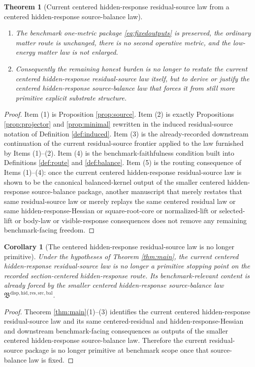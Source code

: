 \documentclass[11pt]{article}
\newcommand{\SourceBalanceLawPackage}{\mathfrak B^{\mathrm{disp,hid,res,src,bal}}}
\newtheorem{corollary}{Corollary}
\newtheorem{theorem}{Theorem}
\begin{document}
\begin{theorem}[Current centered hidden-response residual-source law from a centered hidden-response source-balance law]
\begin{enumerate}
    \item The benchmark one-metric package \eqref{eq:fixedoutputs} is preserved, the ordinary matter route is unchanged, there is no second operative metric, and the low-energy matter law is not enlarged.
    \item Consequently the remaining honest burden is no longer to restate the current centered hidden-response residual-source law itself, but to derive or justify the centered hidden-response source-balance law that forces it from still more primitive explicit substrate structure.
\end{enumerate}
\end{theorem}

\begin{proof}
Item (1) is Proposition \ref{prop:source}. Item (2) is exactly Propositions \ref{prop:projector} and \ref{prop:minimal} rewritten in the induced residual-source notation of Definition \ref{def:induced}. Item (3) is the already-recorded downstream continuation of the current residual-source frontier applied to the law furnished by Items (1)--(2). Item (4) is the benchmark-faithfulness condition built into Definitions \ref{def:route} and \ref{def:balance}. Item (5) is the routing consequence of Items (1)--(4): once the current centered hidden-response residual-source law is shown to be the canonical balanced-kernel output of the smaller centered hidden-response source-balance package, another manuscript that merely restates that same residual-source law or merely replays the same centered residual law or same hidden-response-Hessian or square-root-core or normalized-lift or selected-lift or body-law or visible-response consequences does not remove any remaining benchmark-facing freedom.
\end{proof}

\begin{corollary}[The centered hidden-response residual-source law is no longer primitive]
\label{cor:nonprimitive}
Under the hypotheses of Theorem \ref{thm:main}, the current centered hidden-response residual-source law is no longer a primitive stopping point on the recorded section-centered hidden-response route. Its benchmark-relevant content is already forced by the smaller centered hidden-response source-balance law \(\SourceBalanceLawPackage\).
\end{corollary}

\begin{proof}
Theorem \ref{thm:main}(1)--(3) identifies the current centered hidden-response residual-source law and its same centered-residual and hidden-response-Hessian and downstream benchmark-facing consequences as outputs of the smaller centered hidden-response source-balance law. Therefore the current residual-source package is no longer primitive at benchmark scope once that source-balance law is fixed.
\end{proof}
\end{document}

